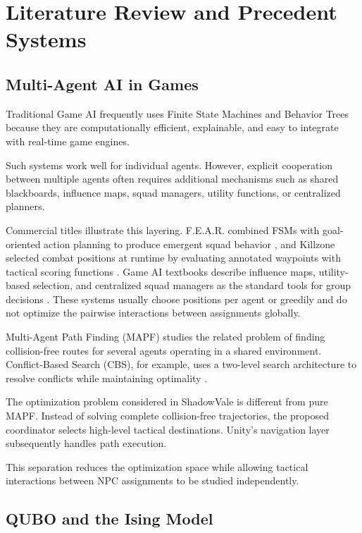 \documentclass[12pt, a4paper]{article}
\begin{document}
\section*{Literature Review and Precedent Systems}

\subsection*{Multi-Agent AI in Games}

Traditional Game AI frequently uses Finite State Machines and Behavior Trees because they are computationally efficient, explainable, and easy to integrate with real-time game engines.

Such systems work well for individual agents. However, explicit cooperation between multiple agents often requires additional mechanisms such as shared blackboards, influence maps, squad managers, utility functions, or centralized planners.

Commercial titles illustrate this layering. F.E.A.R. combined FSMs with goal-oriented action planning to produce emergent squad behavior \cite{Orkin2006}, and Killzone selected combat positions at runtime by evaluating annotated waypoints with tactical scoring functions \cite{Straatman2005}. Game AI textbooks describe influence maps, utility-based selection, and centralized squad managers as the standard tools for group decisions \cite{Yannakakis2018}. These systems usually choose positions per agent or greedily and do not optimize the pairwise interactions between assignments globally.

Multi-Agent Path Finding (MAPF) studies the related problem of finding collision-free routes for several agents operating in a shared environment. Conflict-Based Search (CBS), for example, uses a two-level search architecture to resolve conflicts while maintaining optimality \cite{Sharon2015}.

The optimization problem considered in ShadowVale is different from pure MAPF. Instead of solving complete collision-free trajectories, the proposed coordinator selects high-level tactical destinations. Unity's navigation layer subsequently handles path execution.

This separation reduces the optimization space while allowing tactical interactions between NPC assignments to be studied independently.

\subsection*{QUBO and the Ising Model}
\end{document}
